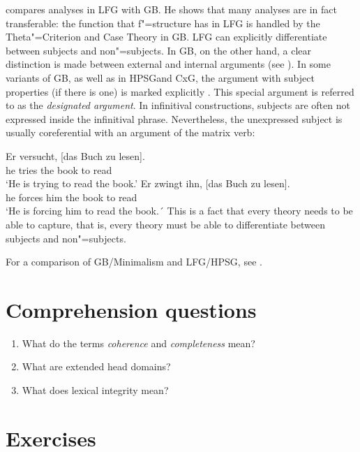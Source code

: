 \citet{Williams84a} compares analyses in LFG with GB. He shows that many analyses are in fact transferable: the function that f"=structure has in LFG is handled by the
Theta"=Criterion and Case Theory in GB. LFG can explicitly differentiate between subjects and non"=subjects. In GB, on the other hand,
a clear distinction is made between external and internal arguments (see \citealp[Section~1.2]{Williams84a}). In some variants of GB, as well as
in HPSG\indexhpsg and CxG\indexcxg, the argument with subject properties (if there is one) is marked explicitly \citep{Haider86,HM94a,Mueller2003e,MR2001a}. This special argument
is referred to as the \emph{designated argument}. In infinitival constructions, subjects are often not expressed inside the infinitival phrase. Nevertheless, 
the unexpressed subject is usually coreferential with an argument of the matrix verb:

\eal
\ex 
\gll Er versucht, [das Buch zu lesen].\\
	 he tries \spacebr{}the book to read\\
\glt `He is trying to read the book.'
\ex 
\gll Er zwingt ihn, [das Buch zu lesen].\\
	 he forces him \spacebr{}the book to read\\
\glt `He is forcing him to read the book.´
\zl 
This is a fact that every theory needs to be able to capture, that is, every theory must be able to differentiate between subjects and non"=subjects.

For a comparison of GB/Minimalism and LFG/HPSG, see .


\section*{Comprehension questions}

\begin{enumerate}
\item What do the terms \emph{coherence} and \emph{completeness} mean?
\item What are extended head domains?
\item What does lexical integrity mean?
\end{enumerate}

\section*{Exercises}

